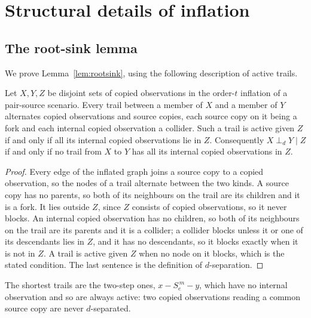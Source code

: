 \section{Structural details of inflation}\label{app:structure}

\subsection{The root-sink lemma}\label{app:rootsink}

We prove Lemma~\ref{lem:rootsink}, using the following description of active trails.

\begin{lemma}\label{lem:trail}
Let $X,Y,Z$ be disjoint sets of copied observations in the order-$t$ inflation of a pair-source scenario. Every trail between a member of $X$ and a member of $Y$ alternates copied observations and source copies, each source copy on it being a fork and each internal copied observation a collider. Such a trail is active given $Z$ if and only if all its internal copied observations lie in $Z$. Consequently $X\perp_dY\mid Z$ if and only if no trail from $X$ to $Y$ has all its internal copied observations in $Z$.
\end{lemma}

\begin{proof}
Every edge of the inflated graph joins a source copy to a copied observation, so the nodes of a trail alternate between the two kinds. A source copy has no parents, so both of its neighbours on the trail are its children and it is a fork. It lies outside $Z$, since $Z$ consists of copied observations, so it never blocks. An internal copied observation has no children, so both of its neighbours on the trail are its parents and it is a collider; a collider blocks unless it or one of its descendants lies in $Z$, and it has no descendants, so it blocks exactly when it is not in $Z$. A trail is active given $Z$ when no node on it blocks, which is the stated condition. The last sentence is the definition of $d$-separation.
\end{proof}

The shortest trails are the two-step ones, $x-S_e^{\,m}-y$, which have no internal observation and so are always active: two copied observations reading a common source copy are never $d$-separated.


